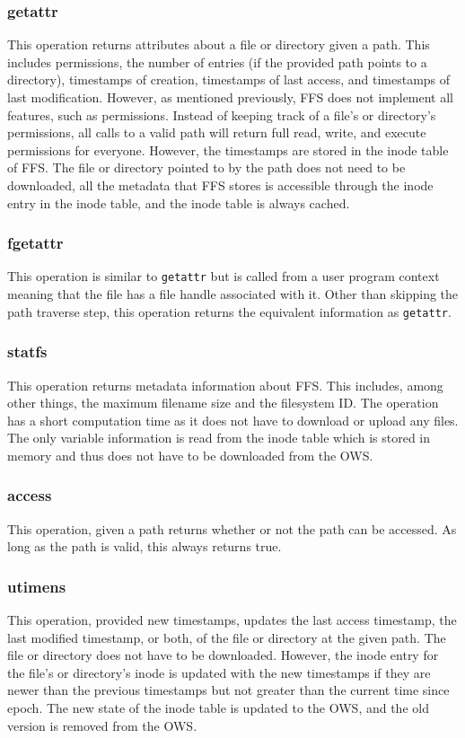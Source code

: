 \subsubsection{getattr}
This operation returns attributes about a file or directory given a path. This includes permissions, the number of entries (if the provided path points to a directory), timestamps of creation, timestamps of last access, and timestamps of last modification. However, as mentioned previously, \gls{FFS} does not implement all features, such as permissions. Instead of keeping track of a file's or directory's permissions, all calls to a valid path will return full read, write, and execute permissions for everyone. However, the timestamps are stored in the inode table of \gls{FFS}. The file or directory pointed to by the path does not need to be downloaded, all the metadata that \gls{FFS} stores is accessible through the inode entry in the inode table, and the inode table is always cached.

\subsubsection{fgetattr}
This operation is similar to \texttt{getattr} but is called from a user program context meaning that the file has a file handle associated with it. Other than skipping the path traverse step, this operation returns the equivalent information as \texttt{getattr}.

\subsubsection{statfs}
This operation returns metadata information about \gls{FFS}. This includes, among other things, the maximum filename size and the filesystem ID. The operation has a short computation time as it does not have to download or upload any files. The only variable information is read from the inode table which is stored in memory and thus does not have to be downloaded from the \gls{OWS}.

\subsubsection{access}
This operation, given a path returns whether or not the path can be accessed. As long as the path is valid, this always returns true.

\subsubsection{utimens}
This operation, provided new timestamps, updates the last access timestamp, the last modified timestamp, or both, of the file or directory at the given path. The file or directory does not have to be downloaded. However, the inode entry for the file's or directory's inode is updated with the new timestamps if they are newer than the previous timestamps but not greater than the current time since epoch. The new state of the inode table is updated to the \gls{OWS}, and the old version is removed from the \gls{OWS}.

